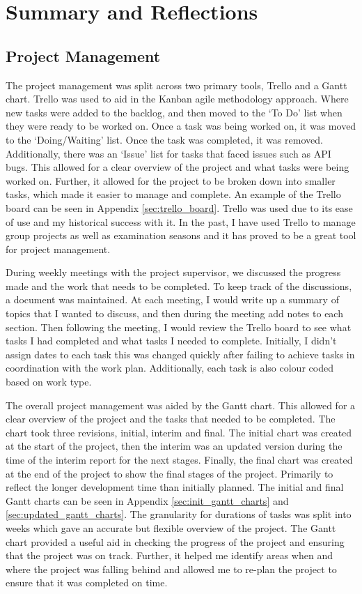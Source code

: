 \documentclass [11pt,a4paper]{article}
\begin{document}
\section{Summary and Reflections}
\label{sec:summary}
\subsection{Project Management}
\label{sec:project_management_summary}

The project management was split across two primary tools, Trello and a Gantt chart. Trello was used to aid in the Kanban agile methodology approach. Where new tasks were added to the backlog, and then moved to the `To Do' list when they were ready to be worked on. Once a task was being worked on, it was moved to the `Doing/Waiting' list. Once the task was completed, it was removed. Additionally, there was an `Issue' list for tasks that faced issues such as API bugs. This allowed for a clear overview of the project and what tasks were being worked on. Further, it allowed for the project to be broken down into smaller tasks, which made it easier to manage and complete. An example of the Trello board can be seen in Appendix \ref{sec:trello_board}. Trello was used due to its ease of use and my historical success with it. In the past, I have used Trello to manage group projects as well as examination seasons and it has proved to be a great tool for project management.

During weekly meetings with the project supervisor, we discussed the progress made and the work that needs to be completed. To keep track of the discussions, a document was maintained. At each meeting, I would write up a summary of topics that I wanted to discuss, and then during the meeting add notes to each section. Then following the meeting, I would review the Trello board to see what tasks I had completed and what tasks I needed to complete. Initially, I didn't assign dates to each task this was changed quickly after failing to achieve tasks in coordination with the work plan. Additionally, each task is also colour coded based on work type.

The overall project management was aided by the Gantt chart. This allowed for a clear overview of the project and the tasks that needed to be completed. The chart took three revisions, initial, interim and final. The initial chart was created at the start of the project, then the interim was an updated version during the time of the interim report for the next stages. Finally, the final chart was created at the end of the project to show the final stages of the project. Primarily to reflect the longer development time than initially planned. The initial and final Gantt charts can be seen in Appendix \ref{sec:init_gantt_charts} and \ref{sec:updated_gantt_charts}. The granularity for durations of tasks was split into weeks which gave an accurate but flexible overview of the project. The Gantt chart provided a useful aid in checking the progress of the project and ensuring that the project was on track. Further, it helped me identify areas when and where the project was falling behind and allowed me to re-plan the project to ensure that it was completed on time.
\end{document}
